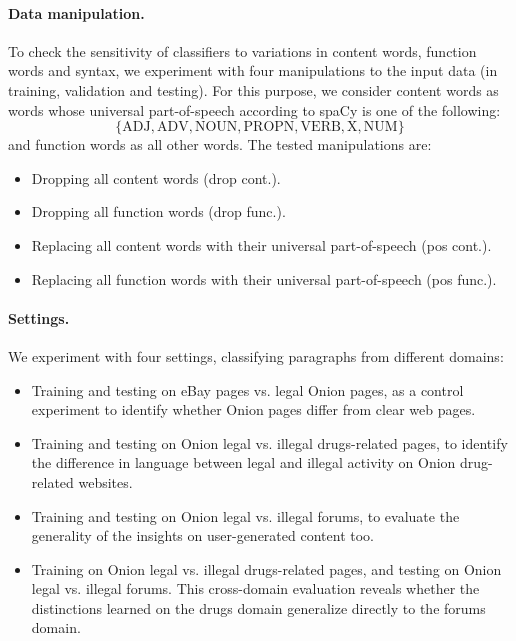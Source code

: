 \documentclass[11pt,a4paper,table]{article}
\begin{document}
\paragraph{Data manipulation.}

To check the sensitivity of classifiers to variations in content words,
function words and syntax, we experiment with four manipulations to the input
data (in training, validation and testing).
For this purpose, we consider content words as words whose universal part-of-speech
according to spaCy is one of the following:
\[\{\mathrm{ADJ, ADV, NOUN, PROPN, VERB, X, NUM}\}\]
and function words as all other words.
The tested manipulations are:

\begin{itemize}
  \item Dropping all content words (drop cont.).
  \item Dropping all function words (drop func.).
  \item Replacing all content words with their universal part-of-speech (pos cont.).
  \item Replacing all function words with their universal part-of-speech (pos func.).
\end{itemize}

\paragraph{Settings.}

We experiment with four settings, classifying paragraphs from different domains:
\begin{itemize}
  \item Training and testing on eBay pages vs. legal Onion pages,
  as a control experiment
  to identify whether Onion pages differ from clear web pages.
  \item Training and testing on Onion legal vs. illegal drugs-related pages,
  to identify the difference in language between legal and illegal activity
  on Onion drug-related websites.
  \item Training and testing on Onion legal vs. illegal forums,
  to evaluate the generality of the insights on user-generated content too.
  \item Training on Onion legal vs. illegal drugs-related pages,
  and testing on Onion legal vs. illegal forums.
  This cross-domain evaluation reveals whether the distinctions learned on the
  drugs domain generalize directly to the forums domain.
\end{itemize}
\end{document}
